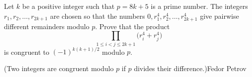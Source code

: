 Let $k$ be a positive integer such that $p = 8k + 5$ is a prime number. The integers $r_1, r_2, \dots, r_{2k+1}$ are chosen so that the numbers $0, r_1^4, r_2^4, \dots, r_{2k+1}^4$ give pairwise different remainders modulo $p$. Prove that the product\[\prod_{1 \leqslant i < j \leqslant 2k+1} \big(r_i^4 + r_j^4\big)\]is congruent to $(-1)^{k(k+1)/2}$ modulo $p$.

(Two integers are congruent modulo $p$ if $p$ divides their difference.)Fedor Petrov